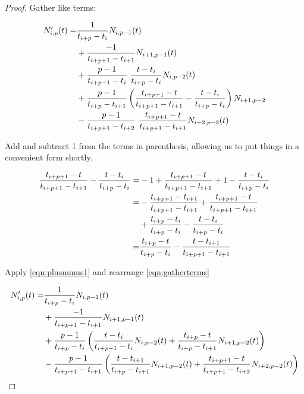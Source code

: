\begin{appendices}
\begin{proof}
Gather like terms:

\begin{equation}
\begin{split}
\label{eqn:gatherterms}
N_{i,p}'(t) =& \frac{1}{t_{i+p} - t_i} N_{i,p-1}(t)\\
& + \frac{-1}{t_{i+p+1} - t_{i+1}} N_{i+1,p-1}(t) \\ 
& + \frac{p-1}{t_{i+p-1} - t_i} ~\frac{t-t_i}{t_{i+p}-t_i} N_{i,p-2}(t)\\
& + \frac{p-1}{t_{i+p} - t_{i+1}} \left( \frac{t_{i+p+1}-t}{t_{i+p+1}-t_{i+1}} - \frac{t-t_i}{t_{i+p}-t_i}\right)  N_{i+1,p-2}\\
& - \frac{p-1}{t_{i+p+1} - t_{i+2}}~\frac{t_{i+p+1}-t}{t_{i+p+1}-t_{i+1}} N_{i+2,p-2}(t)
\end{split}\raisetag{3\baselineskip}
\end{equation}

Add and subtract 1 from the terms in parenthesis, allowing us to put things in a convenient form shortly.

\begin{equation}
\begin{split}
\label{eqn:plusminus1}
\frac{t_{i+p+1}-t}{t_{i+p+1}-t_{i+1}} - \frac{t-t_i}{t_{i+p}-t_i} =& -1 + \frac{t_{i+p+1}-t}{t_{i+p+1}-t_{i+1}} +1 - \frac{t-t_i}{t_{i+p}-t_i}\\
	=& -\frac{t_{i+p+1} - t_{i+1}}{t_{i+p+1} - t_{i+1}} + \frac{t_{i+p+1}-t}{t_{i+p+1}-t_{i+1}}\\
	&+ \frac{t_{i+p} - t_{i}}{t_{i+p} - t_{i}} - \frac{t-t_i}{t_{i+p}-t_i}\\
	=& \frac{t_{i+p} - t}{t_{i+p} - t_{i}} - \frac{t - t_{i+1}}{t_{i+p+1} - t_{i+1}}
\end{split}\raisetag{3\baselineskip}
\end{equation}

Apply \cref{eqn:plusminus1} and rearrange \cref{eqn:gatherterms}

\begin{equation}
\begin{split}
N_{i,p}'(t) =& \frac{1}{t_{i+p} - t_i} N_{i,p-1}(t)\\
& + \frac{-1}{t_{i+p+1} - t_{i+1}} N_{i+1,p-1}(t) \\ 
& + \frac{p-1}{t_{i+p} - t_i} \left( \frac{t-t_i}{t_{i+p-1}-t_i} N_{i,p-2}(t) + \frac{t_{i+p}-t}{t_{i+p}-t_{i+1}} N_{i+1,p-2}(t) \right)\\
& - \frac{p-1}{t_{i+p+1} - t_{i+1}}\left( \frac{t-t_{i+1}}{t_{i+p}-t_{i+1}} N_{i+1,p-2}(t) + \frac{t_{i+p+1}-t}{t_{i+p+1}-t_{i+2}} N_{i+2,p-2}(t) \right)
\end{split}\raisetag{3\baselineskip}
\end{equation}


\end{proof}
\end{appendices}
